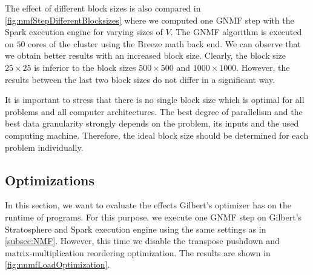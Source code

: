 The effect of different block sizes is also compared in \cref{fig:nmfStepDifferentBlocksizes} where we computed one GNMF step with the Spark execution engine for varying sizes of $V$.
The GNMF algorithm is executed on $50$ cores of the cluster using the Breeze math back end.
We can observe that we obtain better results with an increased block size.
Clearly, the block size $25 \times 25$ is inferior to the block sizes $500\times 500$ and $1000\times 1000$.
However, the results between the last two block sizes do not differ in a significant way.

It is important to stress that there is no single block size which is optimal for all problems and all computer architectures.
The best degree of parallelism and the best data granularity strongly depends on the problem, its inputs and the used computing machine.
Therefore, the ideal block size should be determined for each problem individually.

\subsection{Optimizations}

In this section, we want to evaluate the effects Gilbert's optimizer has on the runtime of programs.
For this purpose, we execute one GNMF step on Gilbert's Stratosphere and Spark execution engine using the same settings as in \cref{subsec:NMF}.
However, this time we disable the transpose pushdown and matrix-multiplication reordering optimization.
The results are shown in \cref{fig:nnmfLoadOptimization}.

